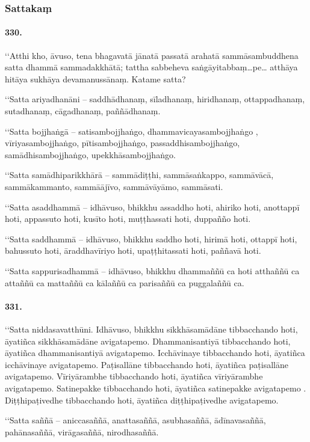 \subsubsection{Sattakaṃ}

\paragraph{330.} ‘‘Atthi kho, āvuso, tena bhagavatā jānatā passatā arahatā sammāsambuddhena satta dhammā sammadakkhātā; tattha sabbeheva saṅgāyitabbaṃ…pe… atthāya hitāya sukhāya devamanussānaṃ. Katame satta?

‘‘Satta ariyadhanāni – saddhādhanaṃ, sīladhanaṃ, hiridhanaṃ, ottappadhanaṃ, sutadhanaṃ, cāgadhanaṃ, paññādhanaṃ.

‘‘Satta bojjhaṅgā – satisambojjhaṅgo, dhammavicayasambojjhaṅgo , vīriyasambojjhaṅgo, pītisambojjhaṅgo, passaddhisambojjhaṅgo, samādhisambojjhaṅgo, upekkhāsambojjhaṅgo.

‘‘Satta samādhiparikkhārā – sammādiṭṭhi, sammāsaṅkappo, sammāvācā, sammākammanto, sammāājīvo, sammāvāyāmo, sammāsati.

‘‘Satta asaddhammā – idhāvuso, bhikkhu assaddho hoti, ahiriko hoti, anottappī hoti, appassuto hoti, kusīto hoti, muṭṭhassati hoti, duppañño hoti.

‘‘Satta saddhammā – idhāvuso, bhikkhu saddho hoti, hirimā hoti, ottappī hoti, bahussuto hoti, āraddhavīriyo hoti, upaṭṭhitassati hoti, paññavā hoti.

‘‘Satta sappurisadhammā – idhāvuso, bhikkhu dhammaññū ca hoti atthaññū ca attaññū ca mattaññū ca kālaññū ca parisaññū ca puggalaññū ca.

\paragraph{331.} ‘‘Satta niddasavatthūni. Idhāvuso, bhikkhu sikkhāsamādāne tibbacchando hoti, āyatiñca sikkhāsamādāne avigatapemo. Dhammanisantiyā tibbacchando hoti, āyatiñca dhammanisantiyā avigatapemo. Icchāvinaye tibbacchando hoti, āyatiñca icchāvinaye avigatapemo. Paṭisallāne tibbacchando hoti, āyatiñca paṭisallāne avigatapemo. Vīriyārambhe tibbacchando hoti, āyatiñca vīriyārambhe avigatapemo. Satinepakke tibbacchando hoti, āyatiñca satinepakke avigatapemo . Diṭṭhipaṭivedhe tibbacchando hoti, āyatiñca diṭṭhipaṭivedhe avigatapemo.

‘‘Satta saññā – aniccasaññā, anattasaññā, asubhasaññā, ādīnavasaññā, pahānasaññā, virāgasaññā, nirodhasaññā.

